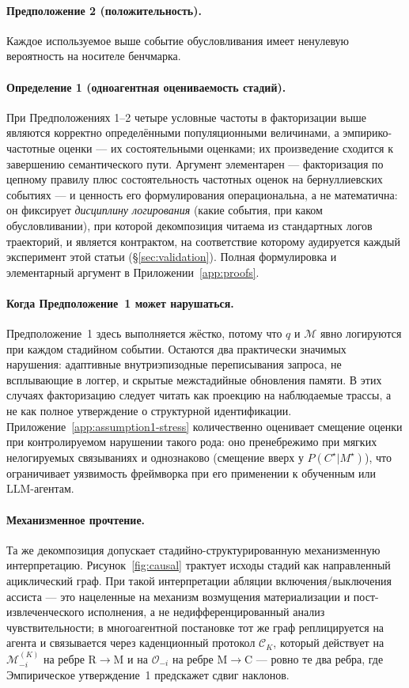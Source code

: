 \documentclass{article}
\begin{document}
\paragraph{Предположение 2 (положительность).}
Каждое используемое выше событие обусловливания имеет ненулевую вероятность на
носителе бенчмарка.

\paragraph{Определение 1 (одноагентная оцениваемость стадий).}
При Предположениях 1--2 четыре условные частоты в факторизации выше являются корректно определёнными популяционными величинами, а эмпирико-частотные оценки --- их состоятельными оценками; их произведение сходится к завершению семантического пути. Аргумент элементарен --- факторизация по цепному правилу плюс состоятельность частотных оценок на бернуллиевских событиях --- и ценность его формулирования операциональна, а не математична: он фиксирует \emph{дисциплину логирования} (какие события, при каком обусловливании), при которой декомпозиция читаема из стандартных логов траекторий, и является контрактом, на соответствие которому аудируется каждый эксперимент этой статьи (\S\ref{sec:validation}). Полная формулировка и элементарный аргумент в Приложении~\ref{app:proofs}.

\paragraph{Когда Предположение~1 может нарушаться.}
Предположение~1 здесь выполняется жёстко, потому что $q$ и $\mathcal{M}$
явно логируются при каждом стадийном событии. Остаются два практически значимых
нарушения: адаптивные внутриэпизодные переписывания запроса, не всплывающие в
логгер, и скрытые межстадийные обновления памяти. В этих случаях
факторизацию следует читать как проекцию на наблюдаемые
трассы, а не как полное утверждение о структурной идентификации.
Приложение~\ref{app:assumption1-stress} количественно оценивает смещение оценки
при контролируемом нарушении такого рода: оно пренебрежимо при мягких
нелогируемых связываниях и однознаково (смещение вверх у
$P(C^\star|M^\star)$), что ограничивает уязвимость фреймворка при его
применении к обученным или LLM-агентам.

\paragraph{Механизменное прочтение.}
Та же декомпозиция допускает стадийно-структурированную механизменную
интерпретацию. Рисунок~\ref{fig:causal} трактует исходы стадий как
направленный ациклический граф. При такой интерпретации абляции включения/выключения
ассиста --- это нацеленные на механизм возмущения материализации и
пост-извлеченческого исполнения, а не недифференцированный анализ
чувствительности; в многоагентной постановке тот же граф реплицируется на
агента и связывается через каденционный протокол $\mathcal{C}_K$,
который действует на $\mathcal{M}_{-i}^{(K)}$ на ребре R$\to$M и на
$\mathcal{O}_{-i}$ на ребре M$\to$C --- ровно те два ребра, где
Эмпирическое утверждение~1 предскажет сдвиг наклонов.
\end{document}
